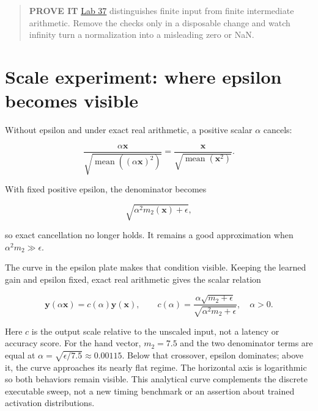 \begin{quote}
\textbf{PROVE IT}
\href{https://github.com/hermonai/inside-the-llm-engine/blob/astra-visual-rewrite/labs/lab-37-rmsnorm-magnitude-stress.md}{Lab
37} distinguishes finite input from finite intermediate arithmetic.
Remove the checks only in a disposable change and watch infinity turn a
normalization into a misleading zero or NaN.
\end{quote}

\section{Scale experiment: where epsilon becomes
visible}\label{scale-experiment-where-epsilon-becomes-visible}

Without epsilon and under exact real arithmetic, a positive scalar
\(\alpha\) cancels:

\begin{equation}
\frac{\alpha\mathbf{x}}
{\sqrt{\operatorname{mean}((\alpha\mathbf{x})^2)}}
=
\frac{\mathbf{x}}
{\sqrt{\operatorname{mean}(\mathbf{x}^2)}}.
\end{equation}

With fixed positive epsilon, the denominator becomes

\begin{equation}
\sqrt{\alpha^2m_2(\mathbf{x})+\epsilon},
\end{equation}

so exact cancellation no longer holds. It remains a good approximation
when \(\alpha^2m_2\gg\epsilon\).

The curve in the epsilon plate makes that condition visible. Keeping the
learned gain and epsilon fixed, exact real arithmetic gives the scalar
relation

\begin{equation}
\mathbf{y}(\alpha\mathbf{x})=c(\alpha)\mathbf{y}(\mathbf{x}),\qquad
c(\alpha)=\frac{\alpha\sqrt{m_2+\epsilon}}
{\sqrt{\alpha^2m_2+\epsilon}},\quad \alpha>0.
\end{equation}

Here \(c\) is the output scale relative to the unscaled input, not a
latency or accuracy score. For the hand vector, \(m_2=7.5\) and the two
denominator terms are equal at
\(\alpha=\sqrt{\epsilon/7.5}\approx0.00115\). Below that crossover,
epsilon dominates; above it, the curve approaches its nearly flat
regime. The horizontal axis is logarithmic so both behaviors remain
visible. This analytical curve complements the discrete executable
sweep, not a new timing benchmark or an assertion about trained
activation distributions.

